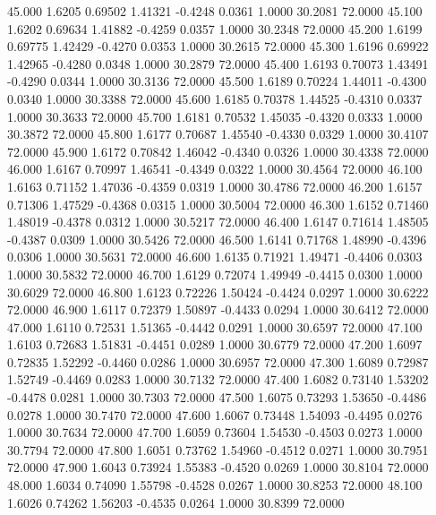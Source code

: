   45.000   1.6205   0.69502   1.41321  -0.4248   0.0361   1.0000  30.2081  72.0000
  45.100   1.6202   0.69634   1.41882  -0.4259   0.0357   1.0000  30.2348  72.0000
  45.200   1.6199   0.69775   1.42429  -0.4270   0.0353   1.0000  30.2615  72.0000
  45.300   1.6196   0.69922   1.42965  -0.4280   0.0348   1.0000  30.2879  72.0000
  45.400   1.6193   0.70073   1.43491  -0.4290   0.0344   1.0000  30.3136  72.0000
  45.500   1.6189   0.70224   1.44011  -0.4300   0.0340   1.0000  30.3388  72.0000
  45.600   1.6185   0.70378   1.44525  -0.4310   0.0337   1.0000  30.3633  72.0000
  45.700   1.6181   0.70532   1.45035  -0.4320   0.0333   1.0000  30.3872  72.0000
  45.800   1.6177   0.70687   1.45540  -0.4330   0.0329   1.0000  30.4107  72.0000
  45.900   1.6172   0.70842   1.46042  -0.4340   0.0326   1.0000  30.4338  72.0000
  46.000   1.6167   0.70997   1.46541  -0.4349   0.0322   1.0000  30.4564  72.0000
  46.100   1.6163   0.71152   1.47036  -0.4359   0.0319   1.0000  30.4786  72.0000
  46.200   1.6157   0.71306   1.47529  -0.4368   0.0315   1.0000  30.5004  72.0000
  46.300   1.6152   0.71460   1.48019  -0.4378   0.0312   1.0000  30.5217  72.0000
  46.400   1.6147   0.71614   1.48505  -0.4387   0.0309   1.0000  30.5426  72.0000
  46.500   1.6141   0.71768   1.48990  -0.4396   0.0306   1.0000  30.5631  72.0000
  46.600   1.6135   0.71921   1.49471  -0.4406   0.0303   1.0000  30.5832  72.0000
  46.700   1.6129   0.72074   1.49949  -0.4415   0.0300   1.0000  30.6029  72.0000
  46.800   1.6123   0.72226   1.50424  -0.4424   0.0297   1.0000  30.6222  72.0000
  46.900   1.6117   0.72379   1.50897  -0.4433   0.0294   1.0000  30.6412  72.0000
  47.000   1.6110   0.72531   1.51365  -0.4442   0.0291   1.0000  30.6597  72.0000
  47.100   1.6103   0.72683   1.51831  -0.4451   0.0289   1.0000  30.6779  72.0000
  47.200   1.6097   0.72835   1.52292  -0.4460   0.0286   1.0000  30.6957  72.0000
  47.300   1.6089   0.72987   1.52749  -0.4469   0.0283   1.0000  30.7132  72.0000
  47.400   1.6082   0.73140   1.53202  -0.4478   0.0281   1.0000  30.7303  72.0000
  47.500   1.6075   0.73293   1.53650  -0.4486   0.0278   1.0000  30.7470  72.0000
  47.600   1.6067   0.73448   1.54093  -0.4495   0.0276   1.0000  30.7634  72.0000
  47.700   1.6059   0.73604   1.54530  -0.4503   0.0273   1.0000  30.7794  72.0000
  47.800   1.6051   0.73762   1.54960  -0.4512   0.0271   1.0000  30.7951  72.0000
  47.900   1.6043   0.73924   1.55383  -0.4520   0.0269   1.0000  30.8104  72.0000
  48.000   1.6034   0.74090   1.55798  -0.4528   0.0267   1.0000  30.8253  72.0000
  48.100   1.6026   0.74262   1.56203  -0.4535   0.0264   1.0000  30.8399  72.0000
